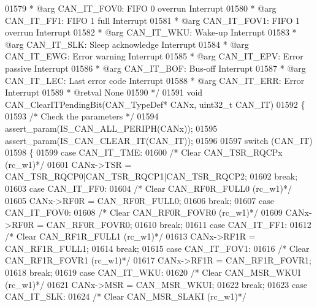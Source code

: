 \begin{DoxyCode}
01579 \textcolor{comment}{  *            @arg CAN\_IT\_FOV0: FIFO 0 overrun Interrupt}
01580 \textcolor{comment}{  *            @arg CAN\_IT\_FF1: FIFO 1 full Interrupt}
01581 \textcolor{comment}{  *            @arg CAN\_IT\_FOV1: FIFO 1 overrun Interrupt}
01582 \textcolor{comment}{  *            @arg CAN\_IT\_WKU: Wake-up Interrupt}
01583 \textcolor{comment}{  *            @arg CAN\_IT\_SLK: Sleep acknowledge Interrupt  }
01584 \textcolor{comment}{  *            @arg CAN\_IT\_EWG: Error warning Interrupt}
01585 \textcolor{comment}{  *            @arg CAN\_IT\_EPV: Error passive Interrupt}
01586 \textcolor{comment}{  *            @arg CAN\_IT\_BOF: Bus-off Interrupt  }
01587 \textcolor{comment}{  *            @arg CAN\_IT\_LEC: Last error code Interrupt}
01588 \textcolor{comment}{  *            @arg CAN\_IT\_ERR: Error Interrupt }
01589 \textcolor{comment}{  * @retval None}
01590 \textcolor{comment}{  */}
01591 \textcolor{keywordtype}{void} CAN_ClearITPendingBit(CAN\_TypeDef* CANx, uint32\_t CAN\_IT)
01592 \{
01593   \textcolor{comment}{/* Check the parameters */}
01594   assert_param(IS\_CAN\_ALL\_PERIPH(CANx));
01595   assert_param(IS\_CAN\_CLEAR\_IT(CAN\_IT));
01596 
01597   \textcolor{keywordflow}{switch} (CAN\_IT)
01598   \{
01599     \textcolor{keywordflow}{case} CAN_IT_TME:
01600       \textcolor{comment}{/* Clear CAN\_TSR\_RQCPx (rc\_w1)*/}
01601       CANx->TSR = CAN_TSR_RQCP0|CAN_TSR_RQCP1|CAN_TSR_RQCP2;
01602       \textcolor{keywordflow}{break};
01603     \textcolor{keywordflow}{case} CAN_IT_FF0:
01604       \textcolor{comment}{/* Clear CAN\_RF0R\_FULL0 (rc\_w1)*/}
01605       CANx->RF0R = CAN_RF0R_FULL0;
01606       \textcolor{keywordflow}{break};
01607     \textcolor{keywordflow}{case} CAN_IT_FOV0:
01608       \textcolor{comment}{/* Clear CAN\_RF0R\_FOVR0 (rc\_w1)*/}
01609       CANx->RF0R = CAN_RF0R_FOVR0;
01610       \textcolor{keywordflow}{break};
01611     \textcolor{keywordflow}{case} CAN_IT_FF1:
01612       \textcolor{comment}{/* Clear CAN\_RF1R\_FULL1 (rc\_w1)*/}
01613       CANx->RF1R = CAN_RF1R_FULL1;
01614       \textcolor{keywordflow}{break};
01615     \textcolor{keywordflow}{case} CAN_IT_FOV1:
01616       \textcolor{comment}{/* Clear CAN\_RF1R\_FOVR1 (rc\_w1)*/}
01617       CANx->RF1R = CAN_RF1R_FOVR1;
01618       \textcolor{keywordflow}{break};
01619     \textcolor{keywordflow}{case} CAN_IT_WKU:
01620       \textcolor{comment}{/* Clear CAN\_MSR\_WKUI (rc\_w1)*/}
01621       CANx->MSR = CAN_MSR_WKUI;
01622       \textcolor{keywordflow}{break};
01623     \textcolor{keywordflow}{case} CAN_IT_SLK:
01624       \textcolor{comment}{/* Clear CAN\_MSR\_SLAKI (rc\_w1)*/}

\end{DoxyCode}
